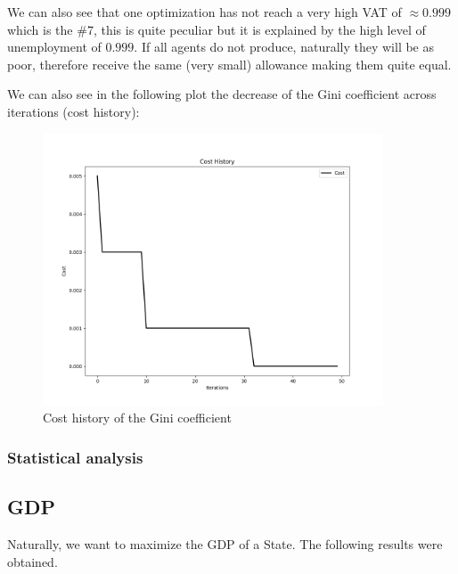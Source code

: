         We can also see that one optimization has not reach a very high VAT of $\approx 0.999$ which is the \#7, this is quite peculiar but it is explained by the high level of unemployment of $0.999$. If all agents do not produce, naturally they will be as poor, therefore receive the same (very small) allowance making them quite equal.

        We can also see in the following plot the decrease of the Gini coefficient across iterations (cost history):

        \begin{figure}[H]
            \centering
            \includegraphics[width=0.9\textwidth]{img/opti/costHistoryGini.png}
            \caption{Cost history of the Gini coefficient}
        \end{figure}

        \subsubsection{Statistical analysis}
        

    \subsection{GDP}

        Naturally, we want to maximize the GDP of a State. The following results were obtained.
    
